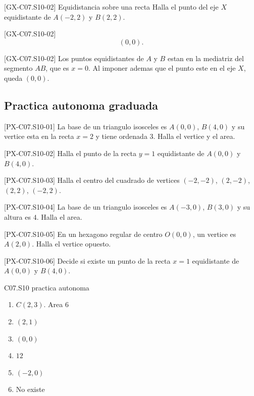 \begin{guidedexercise}{[GX-C07.S10-02] Equidistancia sobre una recta}
Halla el punto del eje \(X\) equidistante de \(A(-2,2)\) y \(B(2,2)\).
\end{guidedexercise}

\begin{shortanswer}{[GX-C07.S10-02]}
\[
(0,0).
\]
\end{shortanswer}

\begin{fullsolution}{[GX-C07.S10-02]}
Los puntos equidistantes de \(A\) y \(B\) estan en la mediatriz del segmento \(AB\), que es
\(x=0\). Al imponer ademas que el punto este en el eje \(X\), queda \((0,0)\).
\end{fullsolution}

\subsection*{Practica autonoma graduada}
\begin{exercise}{[PX-C07.S10-01] La base de un triangulo isosceles es \(A(0,0)\), \(B(4,0)\) y su vertice esta en la recta \(x=2\) y tiene ordenada \(3\). Halla el vertice y el area.}
\end{exercise}
\begin{exercise}{[PX-C07.S10-02] Halla el punto de la recta \(y=1\) equidistante de \(A(0,0)\) y \(B(4,0)\).}
\end{exercise}
\begin{exercise}{[PX-C07.S10-03] Halla el centro del cuadrado de vertices \((-2,-2)\), \((2,-2)\), \((2,2)\), \((-2,2)\).}
\end{exercise}
\begin{exercise}{[PX-C07.S10-04] La base de un triangulo isosceles es \(A(-3,0)\), \(B(3,0)\) y su altura es \(4\). Halla el area.}
\end{exercise}
\begin{exercise}{[PX-C07.S10-05] En un hexagono regular de centro \(O(0,0)\), un vertice es \(A(2,0)\). Halla el vertice opuesto.}
\end{exercise}
\begin{exercise}{[PX-C07.S10-06] Decide si existe un punto de la recta \(x=1\) equidistante de \(A(0,0)\) y \(B(4,0)\).}
\end{exercise}

\begin{shortanswer}{C07.S10 practica autonoma}
\begin{enumerate}[label=\textbf{PX-C07.S10-\arabic*:}, leftmargin=*]
  \item \(C(2,3)\). Area \(6\)
  \item \((2,1)\)
  \item \((0,0)\)
  \item \(12\)
  \item \((-2,0)\)
  \item No existe
\end{enumerate}
\end{shortanswer}

